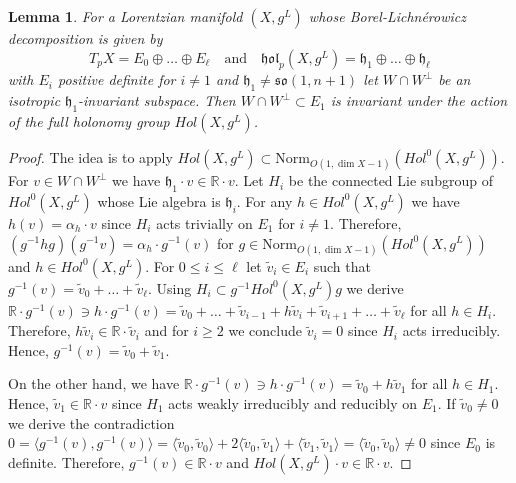 \documentclass[a4paper,10pt,twoside]{amsart}
\newtheorem{lemma}[theorem]{Lemma}
\theoremstyle{definition}
\theoremstyle{remark}
\numberwithin{equation}{section}
\begin{document}
\begin{lemma}
	For a Lorentzian manifold $(X,g^{L})$ whose Borel-Lichn\'erowicz decomposition is given by
	\begin{equation*}
		T_{p}X=E_{0} \oplus \ldots \oplus E_{\ell} \quad \text{and}
						\quad {\mathfrak{{hol}}}_{p}(X,g^{L}) = {\mathfrak{{h}}}_{1}\oplus \ldots \oplus {\mathfrak{{h}}}_{\ell}
	\end{equation*}
	with $E_{i}$ positive definite for $i \neq 1$ and ${\mathfrak{{h}}}_{1} \neq {\mathfrak{{so}}}(1,n+1)$ let $W \cap W^{\perp}$ be an isotropic
	${\mathfrak{{h}}}_{1}$-invariant subspace. Then $W \cap W^{\perp} \subset E_{1}$ is invariant under the action of the full holonomy group
	$Hol(X,g^{L})$.
\end{lemma}
\begin{proof}
	The idea is to apply $Hol(X,g^{L}) \subset \mbox{Norm}_{O(1,\dim X -1)}(Hol^{0}(X,g^{L}))$.
	For $v \in W \cap W^{\perp}$ we have ${\mathfrak{{h}}}_{1}\cdot v \in {\mathbb{R}} \cdot v$. Let $H_{i}$ be the connected Lie subgroup of
	$Hol^{0}(X,g^{L})$ whose Lie algebra is ${\mathfrak{{h}}}_{i}$.
	For any $h \in Hol^{0}(X,g^{L})$ we have $h(v)=\alpha_{h} \cdot v$ since $H_{i}$ acts trivially on $E_{1}$ for $i \neq 1$. Therefore,
	$(g^{-1}hg)(g^{-1}v) = \alpha_{h} \cdot g^{-1}(v)$ for $g \in \mbox{Norm}_{O(1,\dim X -1)}(Hol^{0}(X,g^{L}))$ and $h \in Hol^{0}(X,g^{L})$.
	For $0 \leq i \leq \ell$ let $\tilde{v}_{i} \in E_{i}$ such that $g^{-1}(v) = \tilde{v}_{0} + \ldots + \tilde{v}_{\ell}$.
	Using $H_{i} \subset g^{-1}Hol^{0}(X,g^{L})g$ we derive
	${\mathbb{R}} \cdot g^{-1}(v) \ni h \cdot g^{-1}(v) =\tilde{v}_{0} +\ldots +\tilde{v}_{i-1} +h\tilde{v}_{i} +\tilde{v}_{i+1} +\ldots +\tilde{v}_{\ell}$
	for all $h \in H_{i}$. Therefore, $h \tilde{v}_{i} \in {\mathbb{R}} \cdot \tilde{v}_{i}$ and for $i \geq 2$ we conclude $\tilde{v}_{i}=0$ since $H_{i}$
	acts irreducibly. Hence, $g^{-1}(v)=\tilde{v}_{0}+\tilde{v}_{1}$.\par
	On the other hand, we have ${\mathbb{R}} \cdot g^{-1}(v) \ni h \cdot g^{-1}(v) = \tilde{v}_{0}+ h\tilde{v}_{1}$ for all $h \in H_{1}$. Hence,
	$\tilde{v}_{1} \in {\mathbb{R}} \cdot v$ since $H_{1}$ acts weakly irreducibly and reducibly on $E_{1}$. If $\tilde{v}_{0} \neq 0$ we derive the
	contradiction $0 = {\langle{{g^{-1}(v)}},{{g^{-1}(v)}}\rangle} ={\langle{{\tilde{v}_{0}}},{{\tilde{v}_{0}}}\rangle}+2{\langle{{\tilde{v}_{0}}},{{\tilde{v}_{1}}}\rangle}
							+{\langle{{\tilde{v}_{1}}},{{\tilde{v}_{1}}}\rangle} = {\langle{{\tilde{v}_{0}}},{{\tilde{v}_{0}}}\rangle} \neq 0$
	since $E_{0}$ is definite. Therefore, $g^{-1}(v) \in {\mathbb{R}} \cdot v$ and $Hol(X,g^{L}) \cdot v \in {\mathbb{R}} \cdot v$.
\end{proof}
\end{document}
